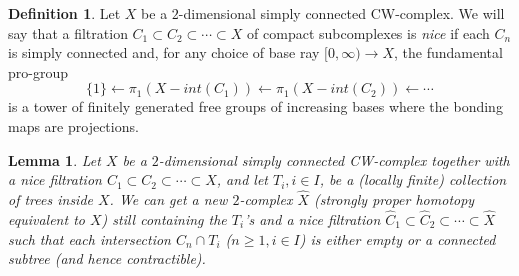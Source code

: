 \documentclass{amsart}[12pt]
\newtheorem{lemma}[theorem]{Lemma}
\theoremstyle{definition}
\newtheorem{definition}[theorem]{Definition}
\theoremstyle{remark}
\numberwithin{equation}{section}
\begin{document}
\begin{definition} Let $X$ be a $2$-dimensional simply connected
CW-complex. We will say that a filtration $C_1 {\subset} C_2 {\subset}
\cdots {\subset} X$ of compact subcomplexes is {\it nice} if each $C_n$
is simply connected and, for any choice of base ray $[0, \infty)
{\longrightarrow} X$, the fundamental pro-group
\[
\{1\} \leftarrow \pi_1(X - int(C_1)) \leftarrow \pi_1(X -
int(C_2)) \leftarrow \cdots
\]
is a tower of finitely generated free groups of increasing bases
where the bonding maps are projections.
\end{definition}
\begin{lemma} \label{alter} Let $X$ be a $2$-dimensional simply connected
CW-complex together with a nice filtration $C_1 {\subset} C_2 {\subset}
\cdots {\subset} X$, and let $T_i, i \in I$, be a (locally finite)
collection of trees inside $X$. We can get a new $2$-complex
$\widehat{X}$ (strongly proper homotopy equivalent to $X$) still
containing the $T_i$'s and a nice filtration $\widehat{C}_1 {\subset}
\widehat{C}_2 {\subset} \cdots {\subset} \widehat{X}$ such that each
intersection $\widehat{C}_n \cap T_i$ ($n \geq 1, i \in I$) is
either empty or a connected subtree (and hence contractible).
\end{lemma}
\end{document}
